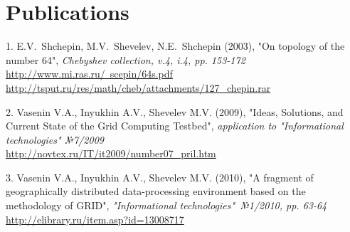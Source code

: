 \documentclass[unicode,a4paper,10pt]{article}
\begin{document}
 

\section{Publications}
1. E.V.~Shchepin, M.V.~Shevelev, N.E.~Shchepin (2003), "On topology of the number 64",
\textit{Chebyshev collection, v.4, i.4, pp. 153-172}\\
\href{http://www.mi.ras.ru/~scepin/64s.pdf}{http://www.mi.ras.ru/~scepin/64s.pdf}\\
\href{http://tsput.ru/res/math/cheb/attachments/127_chepin.rar}{http://tsput.ru/res/math/cheb/attachments/127\_chepin.rar}

2. Vasenin V.A., Inyukhin A.V., Shevelev M.V. (2009), "Ideas, Solutions, and Current State of the Grid Computing Testbed", 
\textit{application to "Informational technologies" №7/2009}\\
\href{http://novtex.ru/IT/it2009/number07\_pril.htm}{http://novtex.ru/IT/it2009/number07\_pril.htm}

3. Vasenin V.A., Inyukhin A.V., Shevelev M.V. (2010), "A fragment of geographically distributed data-processing environment based on the methodology of GRID", 
\textit{"Informational technologies"\ №1/2010, pp. 63-64}\\
\href{http://elibrary.ru/item.asp?id=13008717}{http://elibrary.ru/item.asp?id=13008717}
\end{document}
